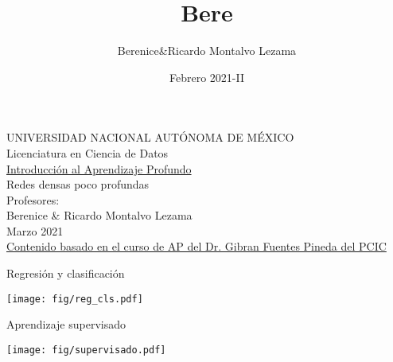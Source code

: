 \documentclass[aspectratio=169,9pt]{beamer}
\title{Bere}
\date{Febrero 2021-II}
\author{Berenice&Ricardo Montalvo Lezama}
\institute{Instituto de Investigaciones en Matemáticas Aplicadas y en Sistemas}
\begin{document}

\begin{frame}
	\begin{center}
		\normalsize{UNIVERSIDAD NACIONAL AUTÓNOMA DE MÉXICO}\\
		\vspace{1mm}
		\normalsize{Licenciatura en Ciencia de Datos}\\
		\vspace{7mm}
		\Large{
			\color{MainColor}
			\href{http://turing.iimas.unam.mx/~bereml/course/iap/}
			{Introducción al Aprendizaje Profundo}
		}\\
		\vspace{2mm}
		\Large{Redes densas poco profundas}\\
		\vspace{7mm}
		\normalsize{Profesores:} \\
		\normalsize{Berenice \& Ricardo Montalvo Lezama} \\
		\medskip
		\footnotesize{Marzo 2021}
		\\\vspace{5mm}
		\normalsize{\href{http://turing.iimas.unam.mx/~gibranfp/cursos/aprendizaje_profundo/}{Contenido basado en el curso de AP del Dr. Gibran Fuentes Pineda del PCIC}} \\
	\end{center}
\end{frame}

\begin{frame}{Regresión y clasificación}
	\begin{center}
		\texttt{[image: fig/reg\_cls.pdf]}
	\end{center}
\end{frame}


\begin{frame}{Aprendizaje supervisado}
\begin{center}
	\texttt{[image: fig/supervisado.pdf]}
\end{center}
\end{frame}
\end{document}

